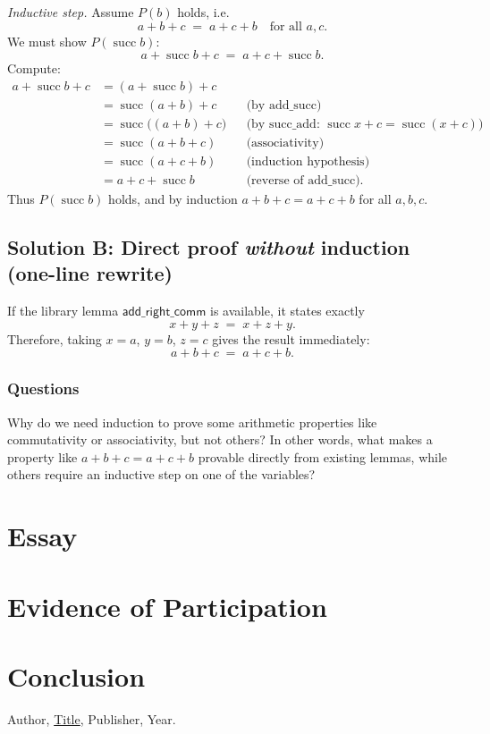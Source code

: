 \documentclass{article}
\theoremstyle{theorem}
\theoremstyle{definition}
\theoremstyle{remark}
\begin{document}
\emph{Inductive step.} Assume \(P(b)\) holds, i.e.
\[
a+b+c \;=\; a+c+b
\quad\text{for all }a,c.
\]
We must show \(P(\operatorname{succ} b)\):
\[
a+\operatorname{succ}b+c \;=\; a+c+\operatorname{succ}b.
\]
Compute:
\[
\begin{aligned}
a+\operatorname{succ}b+c
&= (a+\operatorname{succ}b)+c\\
&= \operatorname{succ}(a+b)+c &&\text{(by \(\text{add\_succ}\))}\\
&= \operatorname{succ}\big((a+b)+c\big) &&\text{(by \(\text{succ\_add}\): }\operatorname{succ}x+c=\operatorname{succ}(x+c))\\
&= \operatorname{succ}(a+b+c) &&\text{(associativity)}\\
&= \operatorname{succ}(a+c+b) &&\text{(induction hypothesis)}\\
&= a+c+\operatorname{succ}b &&\text{(reverse of \(\text{add\_succ}\)).}
\end{aligned}
\]
Thus \(P(\operatorname{succ}b)\) holds, and by induction \(a+b+c=a+c+b\) for all \(a,b,c\).

\subsection*{Solution B: Direct proof \emph{without} induction (one-line rewrite)}
If the library lemma \(\mathsf{add\_right\_comm}\) is available, it states exactly
\[
x + y + z \;=\; x + z + y .
\]
Therefore, taking \(x=a\), \(y=b\), \(z=c\) gives the result immediately:
\[
a + b + c \;=\; a + c + b.
\]


\subsubsection{Questions}
Why do we need induction to prove some arithmetic properties like commutativity or associativity, but not others? 
In other words, what makes a property like $a + b + c = a + c + b$ provable directly from existing lemmas, 
while others require an inductive step on one of the variables?

\section{Essay}

\section{Evidence of Participation}

\section{Conclusion}\label{conclusion}

\begin{thebibliography}{99}
 Author, \href{https://en.wikipedia.org/wiki/LaTeX}{Title}, Publisher, Year.
\end{thebibliography}
\end{document}
